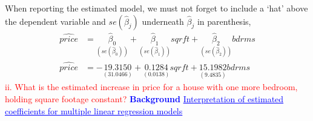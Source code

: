 \documentclass[12pt]{report}
\newenvironment{blueframed}[1][blue]
{\def\FrameCommand{\fboxsep=\FrameSep\fcolorbox{#1}{white}}%
	\MakeFramed {\advance\hsize-\width \FrameRestore}}
{\endMakeFramed}
\begin{document}
\vspace{-\baselineskip}
\noindent When reporting the estimated model, we must not forget to include a `hat' above the dependent variable and $se(\hat{\beta}_j)$ underneath $\hat{\beta}_j$ in parenthesis,
\begin{align*}
	\widehat{price} &= \underset{(se(\hat{\beta}_0))}{\hat{\beta}_0} + \underset{(se(\hat{\beta}_1))}{\hat{\beta}_1}sqrft + \underset{(se(\hat{\beta}_2))}{\hat{\beta}_2}bdrms \\
	\widehat{price} &= -\underset{(31.0466)}{19.3150} + \underset{(0.0138)}{0.1284}sqrft + \underset{(9.4835)}{15.1982}bdrms
\end{align*}
\noindent \textcolor{red}
{
	ii. What is the estimated increase in price for a house with one more bedroom, holding square footage constant?
}
\newpage
\justify
\begin{blueframed}
\textcolor{blue}{\textbf{Background}}
\vspace{-\baselineskip}
\justify
\textcolor{blue}{\underline{Interpretation of estimated coefficients for multiple linear regression models}}


\end{blueframed}
\end{document}
